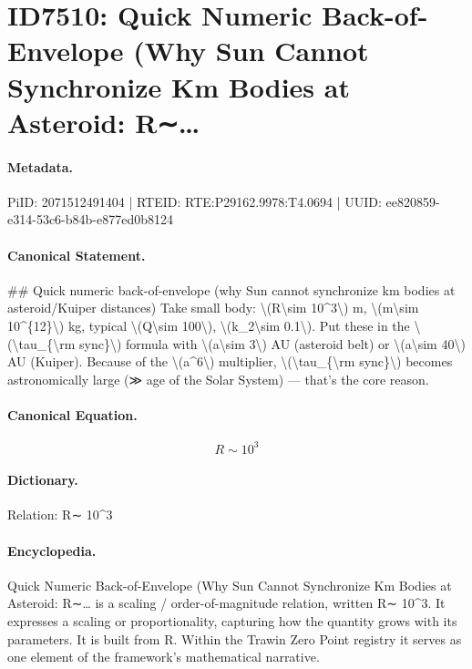 \section*{ID7510: Quick Numeric Back-of-Envelope (Why Sun Cannot Synchronize Km Bodies at Asteroid: R∼…}
\paragraph{Metadata.}
PiID: 2071512491404 | RTEID: RTE:P29162.9978:T4.0694 | UUID: ee820859-e314-53c6-b84b-e877ed0b8124

\paragraph{Canonical Statement.}
\#\# Quick numeric back-of-envelope (why Sun cannot synchronize km bodies at asteroid/Kuiper distances) Take small body: \textbackslash{}(R\textbackslash{}sim 10\textasciicircum{}3\textbackslash{}) m, \textbackslash{}(m\textbackslash{}sim 10\textasciicircum{}\{12\}\textbackslash{}) kg, typical \textbackslash{}(Q\textbackslash{}sim 100\textbackslash{}), \textbackslash{}(k\_2\textbackslash{}sim 0.1\textbackslash{}). Put these in the \textbackslash{}(\textbackslash{}tau\_\{\textbackslash{}rm sync\}\textbackslash{}) formula with \textbackslash{}(a\textbackslash{}sim 3\textbackslash{}) AU (asteroid belt) or \textbackslash{}(a\textbackslash{}sim 40\textbackslash{}) AU (Kuiper). Because of the \textbackslash{}(a\textasciicircum{}6\textbackslash{}) multiplier, \textbackslash{}(\textbackslash{}tau\_\{\textbackslash{}rm sync\}\textbackslash{}) becomes astronomically large (≫ age of the Solar System) — that’s the core reason.

\paragraph{Canonical Equation.}
\[
R\sim 10^3
\]

\paragraph{Dictionary.}
Relation: R∼ 10\textasciicircum{}3

\paragraph{Encyclopedia.}
Quick Numeric Back-of-Envelope (Why Sun Cannot Synchronize Km Bodies at Asteroid: R∼… is a scaling / order-of-magnitude relation, written R∼ 10\textasciicircum{}3. It expresses a scaling or proportionality, capturing how the quantity grows with its parameters. It is built from R. Within the Trawin Zero Point registry it serves as one element of the framework's mathematical narrative.
